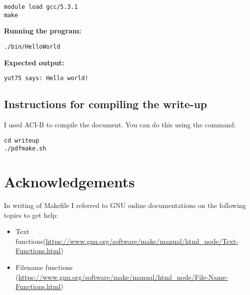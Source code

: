 \documentclass{article}
\begin{document}
\begin{spacing}{1.1}
\begin{verbatim}
module load gcc/5.3.1
make
\end{verbatim}

\textbf{Running the program:}
\begin{verbatim}
./bin/HelloWorld
\end{verbatim}

\textbf{Expected output:}
\begin{verbatim}
yut75 says: Hello world!
\end{verbatim}

\subsection{Instructions for compiling the write-up}

I used ACI-B to compile the document.  You can do this using the command:
\begin{verbatim}
cd writeup
./pdfmake.sh
\end{verbatim}

\section{Acknowledgements}

In writing of Makefile I referred to GNU online documentations on the following topics to get help:
\begin{itemize}
  \item Text functions(\url{https://www.gnu.org/software/make/manual/html_node/Text-Functions.html})
  \item Filename functions (\url{https://www.gnu.org/software/make/manual/html_node/File-Name-Functions.html})
\end{itemize}




\end{spacing}
\end{document}
